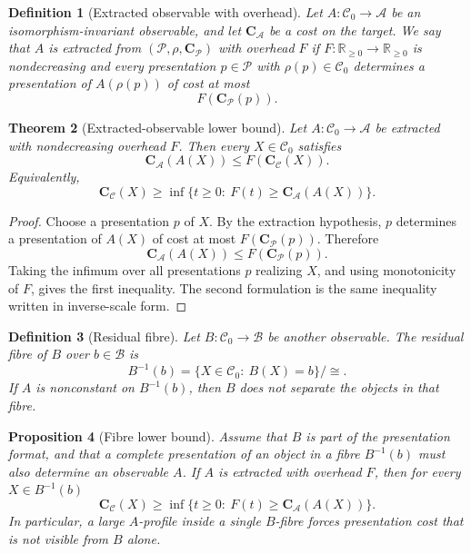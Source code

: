 \documentclass[11pt]{article}
\newtheorem{theorem}{Theorem}[section]
\newtheorem{proposition}[theorem]{Proposition}
\newtheorem{definition}[theorem]{Definition}
\begin{document}
\begin{definition}[Extracted observable with overhead]
Let \(A:\mathcal C_0\to\mathcal A\) be an isomorphism-invariant observable, and let \(\mathbf C_{\mathcal A}\) be a cost on the target.  We say that \(A\) is extracted from \((\mathcal P,\rho,\mathbf C_{\mathcal P})\) with overhead \(F\) if \(F:\mathbb R_{\ge0}\to\mathbb R_{\ge0}\) is nondecreasing and every presentation \(p\in\mathcal P\) with \(\rho(p)\in\mathcal C_0\) determines a presentation of \(A(\rho(p))\) of cost at most
\[
F(\mathbf C_{\mathcal P}(p)).
\]
\end{definition}

\begin{theorem}[Extracted-observable lower bound]
Let \(A:\mathcal C_0\to\mathcal A\) be extracted with nondecreasing overhead \(F\).  Then every \(X\in\mathcal C_0\) satisfies
\[
\mathbf C_{\mathcal A}(A(X))
\le
F(\mathbf C_{\mathcal C}(X)).
\]
Equivalently,
\[
\mathbf C_{\mathcal C}(X)
\ge
\inf\{t\ge0:\ F(t)\ge \mathbf C_{\mathcal A}(A(X))\}.
\]
\end{theorem}

\begin{proof}
Choose a presentation \(p\) of \(X\).  By the extraction hypothesis, \(p\) determines a presentation of \(A(X)\) of cost at most \(F(\mathbf C_{\mathcal P}(p))\).  Therefore
\[
\mathbf C_{\mathcal A}(A(X))\le F(\mathbf C_{\mathcal P}(p)).
\]
Taking the infimum over all presentations \(p\) realizing \(X\), and using monotonicity of \(F\), gives the first inequality.  The second formulation is the same inequality written in inverse-scale form.
\end{proof}

\begin{definition}[Residual fibre]
Let \(B:\mathcal C_0\to\mathcal B\) be another observable.  The residual fibre of \(B\) over \(b\in\mathcal B\) is
\[
B^{-1}(b)=\{X\in\mathcal C_0:\ B(X)=b\}/\cong.
\]
If \(A\) is nonconstant on \(B^{-1}(b)\), then \(B\) does not separate the objects in that fibre.
\end{definition}

\begin{proposition}[Fibre lower bound]
Assume that \(B\) is part of the presentation format, and that a complete presentation of an object in a fibre \(B^{-1}(b)\) must also determine an observable \(A\).  If \(A\) is extracted with overhead \(F\), then for every \(X\in B^{-1}(b)\)
\[
\mathbf C_{\mathcal C}(X)
\ge
\inf\{t\ge0:\ F(t)\ge \mathbf C_{\mathcal A}(A(X))\}.
\]
In particular, a large \(A\)-profile inside a single \(B\)-fibre forces presentation cost that is not visible from \(B\) alone.
\end{proposition}
\end{document}
